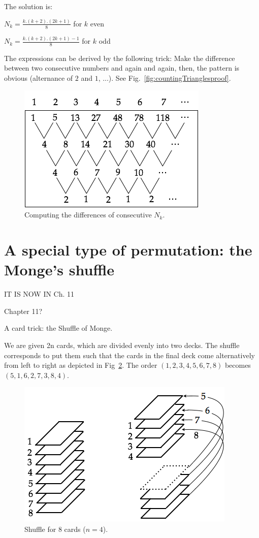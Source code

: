 \documentclass{article}[12pt]
\begin{document}
The solution is:

$N_k = \frac{k.(k+2).(2k+1)}{8}$ for $k$ even

$N_k = \frac{k.(k+2).(2k+1)-1}{8}$ for $k$ odd
\bigskip

The expressions can be derived by the following trick:
Make the difference between two consecutive numbers and again and again, then, the pattern is obvious
(alternance of $2$ and $1$, ...). See Fig.~\ref{fig:countingTrianglesproof}.
\begin{figure}[h]
\begin{center}
        \includegraphics[scale=0.5]{FiguresArithmetic/CountingTrianglesProof} 
        \caption{Computing the differences of consecutive $N_k$.}
        \label{fig:countingTrianglesProof}
\end{center}
\end{figure}


\section{A special type of permutation: the Monge's shuffle}


IT IS NOW IN Ch. 11


Chapter 11?

A card trick: the Shuffle of Monge.

We are given 2n cards, which are divided evenly into two decks. 
The shuffle corresponds to put them such that the cards in the final deck come alternatively from left to right as depicted 
in Fig~\ref{fig:suffleMonge}.
The order $(1,2,3,4,5,6,7,8)$ becomes $(5,1,6,2,7,3,8,4)$.
\begin{figure}[h]
\begin{center}
        \includegraphics[scale=0.5]{FiguresArithmetic/suffleMonge} 
        \caption{Shuffle for $8$ cards ($n=4$).}
        \label{fig:suffleMonge}
\end{center}
\end{figure}
\end{document}
